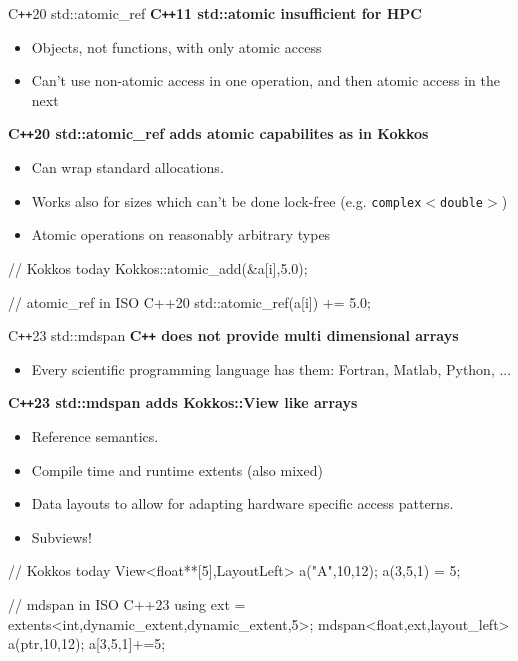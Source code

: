 \iffull
\begin{frame}[fragile]{C\texttt{++}20 std::atomic\_ref}
	\textbf{C\texttt{++}11 std::atomic insufficient for HPC}
	\begin{itemize}
           \item Objects, not functions, with only atomic access
	   \item Can't use non-atomic access in one operation, and then atomic access in the next
	\end{itemize}

	\textbf{C\texttt{++}20 std::atomic\_ref adds atomic capabilites as in Kokkos}
	\begin{itemize}
		\item Can wrap standard allocations.
		\item Works also for sizes which can't be done lock-free (e.g. \texttt{complex$<$double$>$})
		\item Atomic operations on reasonably arbitrary types
	\end{itemize}

  \begin{code}[linebackgroundcolor={
      },
      keywords={atomic_add,atomic_ref}, frame=single
    ]
// Kokkos today
Kokkos::atomic_add(&a[i],5.0);

// atomic_ref in ISO C++20
std::atomic_ref(a[i]) += 5.0;
  \end{code}
\end{frame}
\fi

\iffull
\begin{frame}[fragile]{C\texttt{++}23 std::mdspan}
   \textbf{C\texttt{++} does not provide multi dimensional arrays}
	\begin{itemize}
           \item Every scientific programming language has them: Fortran, Matlab, Python, ... 
	\end{itemize}

	\textbf{C\texttt{++}23 std::mdspan adds Kokkos::View like arrays}
	\begin{itemize}
		\item Reference semantics.
		\item Compile time and runtime extents (also mixed)
		\item Data layouts to allow for adapting hardware specific access patterns. 
		\item Subviews!
	\end{itemize}

  \begin{code}[linebackgroundcolor={
      },
      keywords={View,LayoutLeft,extents,mdspan,dynamic_extent,layout_left}, frame=single
    ]
// Kokkos today
View<float**[5],LayoutLeft> a("A",10,12); a(3,5,1) = 5;

// mdspan in ISO C++23
using ext = extents<int,dynamic_extent,dynamic_extent,5>;
mdspan<float,ext,layout_left> a(ptr,10,12); a[3,5,1]+=5;
  \end{code}

\end{frame}
\fi

